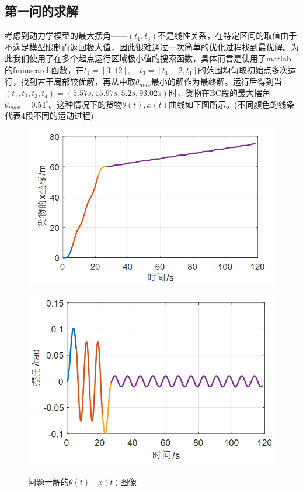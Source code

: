 \documentclass[withoutpreface,bwprint]{cumcmthesis} %
\begin{document}
\subsection{第一问的求解}
考虑到动力学模型的最大摆角——$(t_1,t_3)$不是线性关系，在特定区间的取值由于不满足模型限制而返回极大值，因此很难通过一次简单的优化过程找到最优解。为此我们使用了在多个起点运行区域极小值的搜索函数，具体而言是使用了matlab的fminsearch函数，在$t_1=[3,12],\quad t_3=[t_1-2,t_1]$的范围均匀取初始点多次运行，找到若干局部较优解，再从中取$\theta_{max}$最小的解作为最终解。运行后得到当$(t_1,t_2,t_3,t_4)=(5.57s,15.97s,5.2s,93.02s)$时，货物在BC段的最大摆角$\theta_{max}=0.54^{\circ}$。这种情况下的货物$\theta(t),x(t)$曲线如下图所示。(不同颜色的线条代表4段不同的运动过程)
\begin{figure}[!h]
    \centering
    \begin{minipage}[c]{0.48\textwidth}
        \centering
        \includegraphics[width=\textwidth]{p1x.png}
        \label{fig:sample-figure-a}
    \end{minipage}
    \begin{minipage}[c]{0.48\textwidth}
        \centering
        \includegraphics[width=\textwidth]{p1theta.png}
        \label{fig:sample-figure-b}
    \end{minipage}
    \caption{问题一解的$\theta(t)\quad x(t)$图像}
    \label{fig:sample-figure}
\end{figure}
\end{document}
